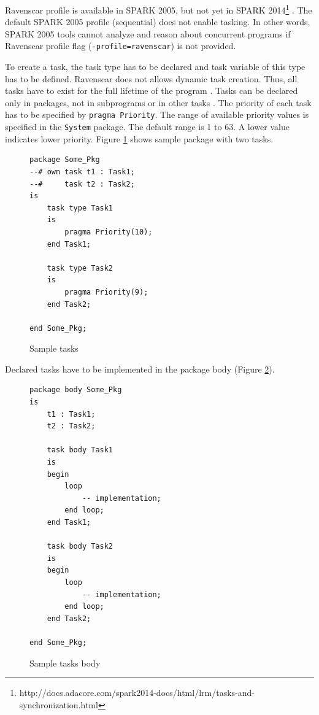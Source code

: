 Ravenscar profile is available in SPARK 2005, but not yet in SPARK 2014\footnote{http://docs.adacore.com/spark2014-docs/html/lrm/tasks-and-synchronization.html} \cite{Spark2014refManual:Online}. The default SPARK 2005 profile (sequential) does not enable tasking. In other words, SPARK 2005 tools cannot analyze and reason about concurrent programs if Ravenscar profile flag (\lstinline{-profile=ravenscar}) is not provided.

To create a task, the task type has to be declared and task variable of this type has to be defined. Ravenscar does not allows dynamic task creation. Thus, all tasks have to exist for the full lifetime of the program \cite{IssuesWithRavenscar:Paper}. Tasks can be declared only in packages, not in subprograms or in other tasks \cite{Barnes:Book}. The priority of each task has to be specified by \lstinline{pragma Priority}. The range of available priority values is specified in the \lstinline{System} package. The default range is 1 to 63. A lower value indicates lower priority. Figure \ref{listing:SampleTask} shows sample package with two tasks.

\begin{figure}
\singlespacing
\begin{lstlisting}[frame=single, gobble=0]
package Some_Pkg
--# own task t1 : Task1;
--#     task t2 : Task2;
is
	task type Task1
	is
		pragma Priority(10);
	end Task1;

	task type Task2
	is
		pragma Priority(9);
	end Task2;

end Some_Pkg;
\end{lstlisting} 
\doublespacing
\caption{Sample tasks}
\label{listing:SampleTask}
\end{figure}


Declared tasks have to be implemented in the package body (Figure \ref{listing:SampleTaskBody}).

\begin{figure}
\singlespacing
\begin{lstlisting}[frame=single, gobble=0, ]
package body Some_Pkg
is
	t1 : Task1;
	t2 : Task2;

	task body Task1
	is
	begin
		loop
			-- implementation;
		end loop;
	end Task1;

	task body Task2
	is
	begin
		loop
			-- implementation;
		end loop;
	end Task2;

end Some_Pkg;
\end{lstlisting} 
\doublespacing
\caption{Sample tasks body}
\label{listing:SampleTaskBody}
\end{figure}

